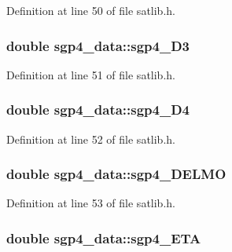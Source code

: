 Definition at line 50 of file satlib.\-h.

\hypertarget{structsgp4__data_a711e799a5f092af2739fc0240c716b5b}{
\subsubsection[{sgp4\-\_\-\-D3}]{\setlength{\rightskip}{0pt plus 5cm}double sgp4\-\_\-data\-::sgp4\-\_\-\-D3}}\label{structsgp4__data_a711e799a5f092af2739fc0240c716b5b}


Definition at line 51 of file satlib.\-h.

\hypertarget{structsgp4__data_ad992dcf93a4683e135e901c6ed08886e}{
\subsubsection[{sgp4\-\_\-\-D4}]{\setlength{\rightskip}{0pt plus 5cm}double sgp4\-\_\-data\-::sgp4\-\_\-\-D4}}\label{structsgp4__data_ad992dcf93a4683e135e901c6ed08886e}


Definition at line 52 of file satlib.\-h.

\hypertarget{structsgp4__data_ab590ea761a20f350d40ee7475493c6af}{
\subsubsection[{sgp4\-\_\-\-D\-E\-L\-M\-O}]{\setlength{\rightskip}{0pt plus 5cm}double sgp4\-\_\-data\-::sgp4\-\_\-\-D\-E\-L\-M\-O}}\label{structsgp4__data_ab590ea761a20f350d40ee7475493c6af}


Definition at line 53 of file satlib.\-h.

\hypertarget{structsgp4__data_ac5cf1b16a0d7d907e601090f97d66f4a}{
\subsubsection[{sgp4\-\_\-\-E\-T\-A}]{\setlength{\rightskip}{0pt plus 5cm}double sgp4\-\_\-data\-::sgp4\-\_\-\-E\-T\-A}}\label{structsgp4__data_ac5cf1b16a0d7d907e601090f97d66f4a}


